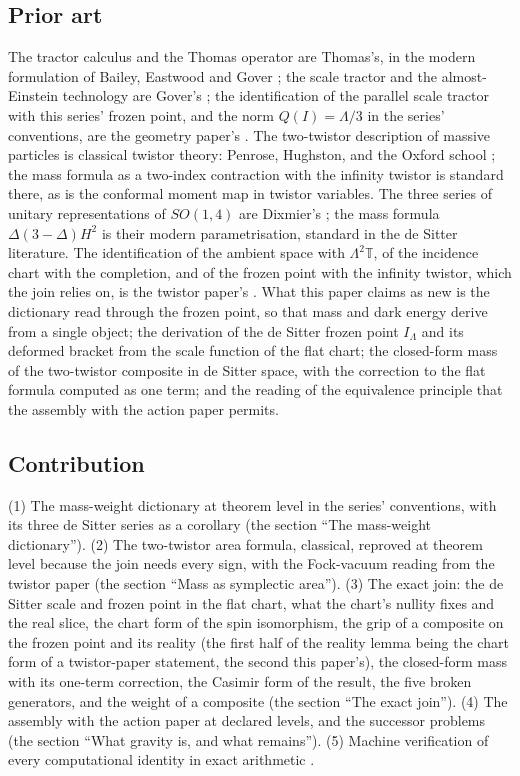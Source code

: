 \documentclass[11pt]{article}
\theoremstyle{definition}
\theoremstyle{plain}
\providecommand{\T}{}\renewcommand{\T}{\mathbb{T}}
\begin{document}
\subsection*{Prior art}
\label{c:note.mass.setting-prior-art}
The tractor calculus and the Thomas operator are Thomas's, in the modern formulation of Bailey, Eastwood and Gover \cite{BEG1994}; the scale tractor and the almost-Einstein technology are Gover's \cite{Gover2010}; the identification of the parallel scale tractor with this series' frozen point, and the norm $Q(I) = \Lambda/3$ in the series' conventions, are the geometry paper's \cite{ButlerT6}. The two-twistor description of massive particles is classical twistor theory: Penrose, Hughston, and the Oxford school \cite{PenroseRindler1986, Hughston1979}; the mass formula as a two-index contraction with the infinity twistor is standard there, as is the conformal moment map in twistor variables. The three series of unitary representations of $SO(1,4)$ are Dixmier's \cite{Dixmier1961}; the mass formula $\Delta(3-\Delta)H^{2}$ is their modern parametrisation, standard in the de Sitter literature. The identification of the ambient space with $\Lambda^{2}\T$, of the incidence chart with the completion, and of the frozen point with the infinity twistor, which the join relies on, is the twistor paper's \cite{ButlerT9}. What this paper claims as new is the dictionary read through the frozen point, so that mass and dark energy derive from a single object; the derivation of the de Sitter frozen point $I_{\Lambda}$ and its deformed bracket from the scale function of the flat chart; the closed-form mass of the two-twistor composite in de Sitter space, with the correction to the flat formula computed as one term; and the reading of the equivalence principle that the assembly with the action paper permits.

\subsection*{Contribution}
\label{c:note.mass.setting-contribution}
(1) The mass-weight dictionary at theorem level in the series' conventions, with its three de Sitter series as a corollary (the section ``The mass-weight dictionary''). (2) The two-twistor area formula, classical, reproved at theorem level because the join needs every sign, with the Fock-vacuum reading from the twistor paper (the section ``Mass as symplectic area''). (3) The exact join: the de Sitter scale and frozen point in the flat chart, what the chart's nullity fixes and the real slice, the chart form of the spin isomorphism, the grip of a composite on the frozen point and its reality (the first half of the reality lemma being the chart form of a twistor-paper statement, the second this paper's), the closed-form mass with its one-term correction, the Casimir form of the result, the five broken generators, and the weight of a composite (the section ``The exact join''). (4) The assembly with the action paper at declared levels, and the successor problems (the section ``What gravity is, and what remains''). (5) Machine verification of every computational identity in exact arithmetic \cite{ButlerVerifyT11}.
\end{document}
